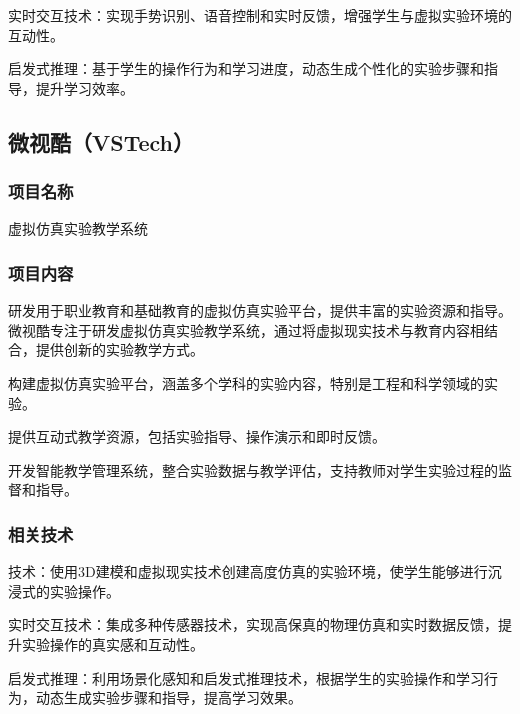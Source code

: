 实时交互技术：实现手势识别、语音控制和实时反馈，增强学生与虚拟实验环境的互动性。

启发式推理：基于学生的操作行为和学习进度，动态生成个性化的实验步骤和指导，提升学习效率。

\subsection{微视酷（VSTech）}\label{微视酷（VSTech）}

\subsubsection{项目名称}

虚拟仿真实验教学系统

\subsubsection{项目内容}

研发用于职业教育和基础教育的虚拟仿真实验平台，提供丰富的实验资源和指导。微视酷专注于研发虚拟仿真实验教学系统，通过将虚拟现实技术与教育内容相结合，提供创新的实验教学方式。

构建虚拟仿真实验平台，涵盖多个学科的实验内容，特别是工程和科学领域的实验。

提供互动式教学资源，包括实验指导、操作演示和即时反馈。

开发智能教学管理系统，整合实验数据与教学评估，支持教师对学生实验过程的监督和指导。

\subsubsection{相关技术}

技术：使用3D建模和虚拟现实技术创建高度仿真的实验环境，使学生能够进行沉浸式的实验操作。

实时交互技术：集成多种传感器技术，实现高保真的物理仿真和实时数据反馈，提升实验操作的真实感和互动性。

启发式推理：利用场景化感知和启发式推理技术，根据学生的实验操作和学习行为，动态生成实验步骤和指导，提高学习效果。

